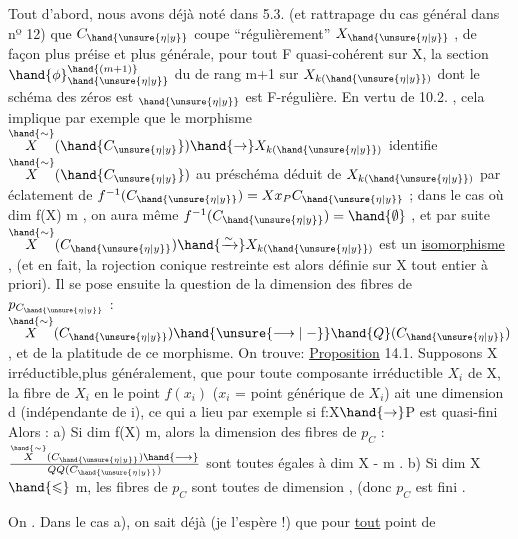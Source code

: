 Tout d'abord, nous avons déjà noté dans 5.3. (et rattrapage du
cas général dans nº 12)  que $C_{\hand{\unsure{\eta|y}}}$  coupe ``régulièrement'' $X_{\hand{\unsure{\eta|y}}}$ , de façon
plus préise et plus générale, pour tout F quasi-cohérent sur X,
la section $\hand{\phi}_{\hand{\unsure{\eta|y}}}^{\hand{(m+1)}}$ du  de rang  m+1  sur  $X_{k(\hand{\unsure{\eta|y}})}$  dont le
schéma des zéros est $_{\hand{\unsure{\eta|y}}}$ \over{;}{\unsure{;|,}} est F-régulière. En vertu de 10.2. , cela
implique par exemple que le morphisme  $\overset{\hand{\sim}}{X}(\hand{C_{\unsure{\eta|y}}})\hand{\to} X_{k(\hand{\unsure{\eta|y}})}$ identifie $\overset{\hand{\sim}}{X}(\hand{C_{\unsure{\eta|y}}})$ au préschéma
déduit de $X_{k(\hand{\unsure{\eta|y}})}$ par éclatement de $f^{-1}(C_{\hand{\unsure{\eta|y}}})= Xx_P C_{\hand{\unsure{\eta|y}}}$ ;   dans le cas
où  dim f(X) \hand{$\leqslant$} m ,  on  aura même  $f^{-1}(C_{\hand{\unsure{\eta|y}}}) = \hand{\emptyset}$ , et  par suite
$\overset{\hand{\sim}}{X}(C_{\hand{\unsure{\eta|y}}}) \hand{\xrightarrow{\sim}} X_{k(\hand{\unsure{\eta|y}})}$  est un \uline{isomorphisme} , (et en fait, la rojection conique
restreinte  est alors définie sur X tout entier à priori). Il se pose
ensuite la question de la dimension des fibres de $p_{C_{\hand{\unsure{\eta|y}}}}$ : $\overset{\hand{\sim}}{X}(C_{\hand{\unsure{\eta|y}}}) \hand{\unsure{\longrightarrow|\relbar}} \hand{Q}(C_{\hand{\unsure{\eta|y}}})$,
et de la platitude de ce morphisme. On trouve:
\uline{Proposition} 14.1.   Supposons X irréductible,plus
généralement, que  pour toute composante irréductible $X_i$ de X, la fibre
de $X_i$ en le point $f(x_i)$  ($x_i$ = point générique de $X_i$) ait une dimension d
(indépendante de i), ce qui a lieu par exemple  si f:X$\hand{\to}$P est quasi-fini\hand{,} 
Alors :     a)  Si  dim f(X) \hand{$>$} m, alors la dimension  des fibres de
$p_C$  : $\overset{\hand{\sim}}{X}(C_{\hand{\unsure{\eta|y}}}) \hand{\longrightarrow} \over{Q}{Q}(C_{\hand{\unsure{\eta|y}}})$  sont toutes égales à  dim X - m .   b)  Si dim X
$\hand{\leqslant}$ m,  les fibres  de $p_C$  sont toutes de dimension ,  (donc $p_C$ est fini   \hand{]}.

On 
. Dans le cas a), 
 on sait déjà (je l'espère !) que pour \uline{tout}  point  de

